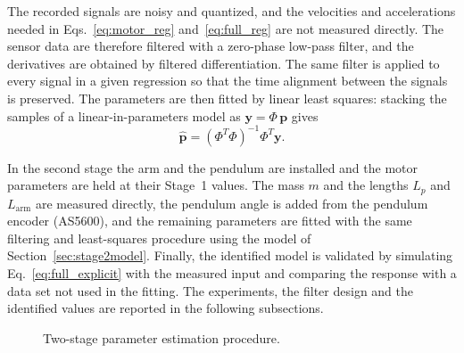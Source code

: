 \documentclass[a4paper,11pt]{article}
\newcommand{\La}{L_{\mathrm{arm}}}
\begin{document}
The recorded signals are noisy and quantized, and the velocities and accelerations needed in Eqs.~\eqref{eq:motor_reg} and~\eqref{eq:full_reg} are not measured directly. The sensor data are therefore filtered with a zero-phase low-pass filter, and the derivatives are obtained by filtered differentiation. The same filter is applied to every signal in a given regression so that the time alignment between the signals is preserved. The parameters are then fitted by linear least squares: stacking the samples of a linear-in-parameters model as $\mathbf{y} = \Phi\, \mathbf{p}$ gives
\begin{equation}
  \hat{\mathbf{p}} = \left(\Phi^T \Phi\right)^{-1} \Phi^T \mathbf{y} .
\end{equation}

In the second stage the arm and the pendulum are installed and the motor parameters are held at their Stage~1 values. The mass $m$ and the lengths $L_p$ and $\La$ are measured directly, the pendulum angle is added from the pendulum encoder (AS5600), and the remaining parameters are fitted with the same filtering and least-squares procedure using the model of Section~\ref{sec:stage2model}. Finally, the identified model is validated by simulating Eq.~\eqref{eq:full_explicit} with the measured input and comparing the response with a data set not used in the fitting. The experiments, the filter design and the identified values are reported in the following subsections.

\begin{figure}[h]
\centering
{}
\caption{Two-stage parameter estimation procedure.}
\label{fig:stages}
\end{figure}
\end{document}
